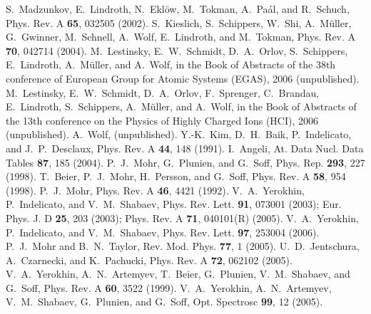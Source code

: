 \documentclass[preprint,aps,pra,showpacs,floatfix]{revtex4}
\begin{document}
\begin{thebibliography}{99}
%
S.~Madzunkov, E.~Lindroth, N.~Ekl\"{o}w, M.~Tokman, A.~Pa\'{a}l, and R.~Schuch,
Phys. Rev. A {\bf 65}, 032505 (2002).
%
S.~Kieslich, S.~Schippers, W.~Shi, A.~M\"{u}ller, G.~Gwinner,
M.~Schnell, A.~Wolf, E.~Lindroth, and M.~Tokman,
Phys. Rev. A {\bf 70}, 042714 (2004).
%
M.~Lestinsky, E.~W.~Schmidt, D.~A.~Orlov, S.~Schippers,
E.~Lindroth, A.~M\"{u}ller, and A.~Wolf,
in the Book of Abstracts of the 38th conference of European Group for Atomic Systems (EGAS), 2006 (unpublished).
%
M.~Lestinsky, E.~W.~Schmidt, D.~A.~Orlov, F.~Sprenger, C.~Brandau,
E.~Lindroth, S.~Schippers, A.~M\"{u}ller, and A.~Wolf,
in the Book of Abstracts of the 13th conference on the Physics of Highly Charged Ions (HCI), 2006 (unpublished).
%
%
A.~Wolf, (unpublished).
%
Y.-K.~Kim, D.~H.~Baik, P.~Indelicato, and J.~P.~Desclaux,
Phys. Rev. A {\bf 44}, 148 (1991).
%
I.~Angeli,
At. Data Nucl. Data Tables \textbf{87}, 185 (2004).
%
P.~J.~Mohr, G.~Plunien, and G.~Soff,
Phys. Rep. {\bf 293}, 227 (1998).
%
T.~Beier, P.~J.~Mohr, H.~Persson, and G.~Soff,
Phys. Rev. A \textbf{58}, 954 (1998).
%
P.~J.~Mohr,
Phys. Rev. A \textbf{46}, 4421 (1992).
%
V.~A.~Yerokhin, P.~Indelicato, and V.~M.~Shabaev,
Phys. Rev. Lett. \textbf{91}, 073001 (2003);
Eur. Phys. J. D {\bf 25}, 203 (2003);
Phys. Rev. A {\bf 71}, 040101(R) (2005).
%
V.~A.~Yerokhin, P.~Indelicato, and V.~M.~Shabaev,
Phys. Rev. Lett. \textbf{97}, 253004 (2006).
%
P.~J.~Mohr and B.~N.~Taylor,
Rev. Mod. Phys. \textbf{77}, 1 (2005).
%
U.~D.~Jentschura, A.~Czarnecki, and K.~Pachucki,
Phys. Rev. A \textbf{72}, 062102 (2005).
%
V.~A.~Yerokhin, A.~N.~Artemyev, T.~Beier, G.~Plunien, V.~M.~Shabaev, and G.~Soff,
Phys. Rev. A \textbf{60}, 3522 (1999).
%
V.~A.~Yerokhin, A.~N.~Artemyev, V.~M.~Shabaev, G.~Plunien, and G.~Soff,
Opt. Spectrosc {\bf 99}, 12 (2005).
%

\end{thebibliography}
\end{document}
